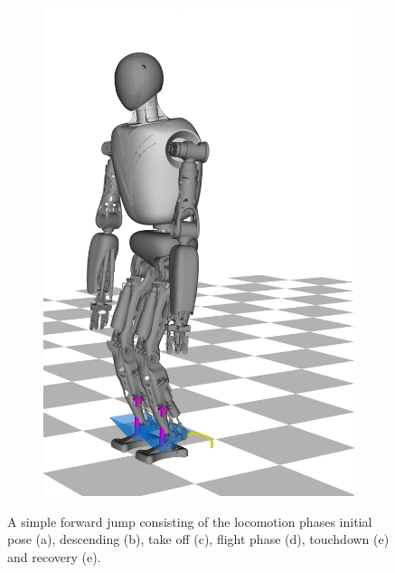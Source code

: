 \begin{figure}[h!]
\begin{subfigure}{.16\textwidth}
	\includegraphics[width=1\linewidth]{fig/jumpForward/snaps/6x}
	\caption{}
\end{subfigure}%
\caption[A simple forward jump]{A simple forward jump consisting of the locomotion phases initial pose (a), descending (b), take off (c), flight phase (d), touchdown (e) and recovery (e).}
\label{fig:jumpForward_Snaps}
\end{figure} 

